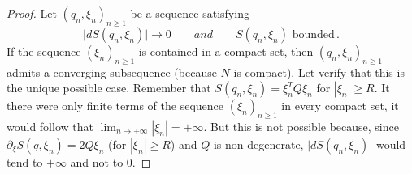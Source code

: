 \documentclass[10pt,a4paper]{amsart}
\begin{document}
\begin{proof}
Let $(q_n, \xi_n)_{n \ge 1}$ be a sequence satisfying
$$\vert{dS(q_n,\xi_n)}\vert \to 0 \qquad {and} \qquad S(q_n,\xi_n) \text{ bounded}\, .$$
If the sequence $(\xi_n)_{n \ge 1}$ is contained in a compact set, then $(q_n, \xi_n)_{n\ge 1}$ admits 
a converging subsequence (because $N$ is compact). Let verify that this is the unique possible case. Remember that $S(q_n,\xi_n) = \xi_n^T Q \xi_n$ for $|\xi_n| \ge R$. It there were only finite terms of the sequence $(\xi_n)_{n \ge 1}$ in every compact set, it would follow that $\lim_{n \to +\infty} |\xi_n| = +\infty$. But this is not possible because, since $\partial_{\xi}S(q,\xi_n) = 2 Q \xi_n$ (for $|\xi_n| \ge R$) and $Q$ is non degenerate, $\vert{dS(q_n,\xi_n)}\vert$ would tend to $+\infty$ and not to $0$.
\end{proof}
\end{document}
